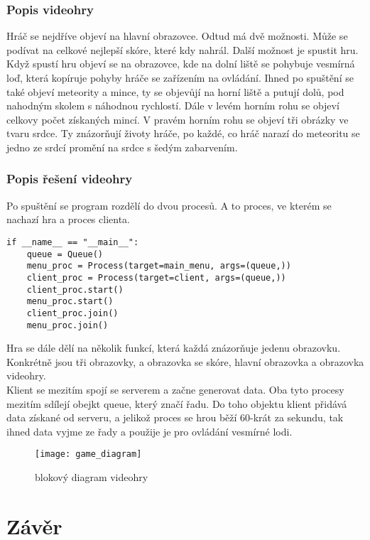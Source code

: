 \documentclass[12pt]{report}			%
\begin{document}
\subsection{Popis videohry}
Hráč se nejdříve objeví na hlavní obrazovce. Odtud má dvě možnosti. Může se podívat na celkové nejlepší skóre, které kdy nahrál. Další možnost je spustit hru. Když spustí hru objeví se na obrazovce, kde na dolní liště se pohybuje vesmírná loď, která kopíruje pohyby hráče se zařízením na ovládání. Ihned po spuštění se také objeví meteority a mince, ty se objevůjí na horní liště a putují dolů, pod nahodným skolem s náhodnou rychlostí. Dále v levém horním rohu se objeví celkovy počet získaných mincí. V pravém horním rohu se objeví tři obrázky ve tvaru srdce. Ty znázorňují životy hráče, po každé, co hráč narazí do meteoritu se jedno ze srdcí promění na srdce s šedým zabarvením. 


\subsection{Popis řešení videohry}
Po spuštění se program rozdělí do dvou procesů. A to proces, ve kterém se nachazí hra a proces clienta. 

\begin{lstlisting}[title={Program game.py}, caption={game.py}]
if __name__ == "__main__":
    queue = Queue() 
    menu_proc = Process(target=main_menu, args=(queue,)) 
    client_proc = Process(target=client, args=(queue,))  
    client_proc.start()
    menu_proc.start()
    client_proc.join()
    menu_proc.join()
\end{lstlisting}
Hra se dále dělí na několik funkcí, která každá znázorňuje jedenu obrazovku. Konkrétně jsou tři obrazovky, a obrazovka se skóre, hlavní obrazovka a obrazovka videohry.
\\
Klient se mezitím spojí se serverem a začne generovat data. Oba tyto procesy mezitím sdílejí obejkt queue, který značí řadu. Do toho objektu klient přidává data získané od serveru, a jelikož proces se hrou běží 60-krát za sekundu, tak ihned data vyjme ze řady a použije je pro ovládání vesmírné lodi.

\begin{figure}[h]
\caption{blokový diagram videohry}
\centering
\texttt{[image: game\_diagram]}
\end{figure}


	\chapter*{Závěr}
	
\end{document}
